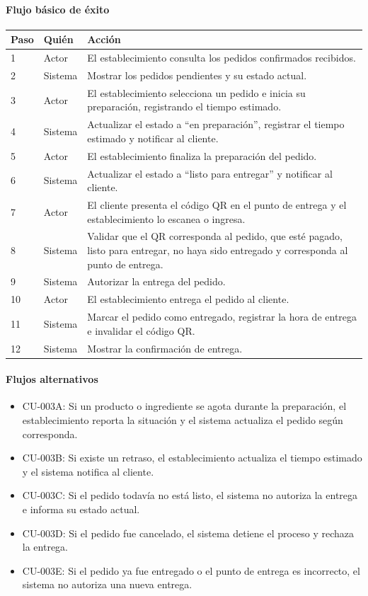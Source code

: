 \paragraph{Flujo básico de éxito}
\begin{longtable}{P{1.1cm}P{1.8cm}P{10.5cm}}
\toprule
\textbf{Paso} & \textbf{Quién} & \textbf{Acción}\\
\midrule
{} & Actor & El establecimiento consulta los pedidos confirmados recibidos.\\
2 & Sistema & Mostrar los pedidos pendientes y su estado actual.\\
3 & Actor & El establecimiento selecciona un pedido e inicia su preparación, registrando el tiempo estimado.\\
4 & Sistema & Actualizar el estado a “en preparación”, registrar el tiempo estimado y notificar al cliente.\\
5 & Actor & El establecimiento finaliza la preparación del pedido.\\
6 & Sistema & Actualizar el estado a “listo para entregar” y notificar al cliente.\\
7 & Actor & El cliente presenta el código QR en el punto de entrega y el establecimiento lo escanea o ingresa.\\
8 & Sistema & Validar que el QR corresponda al pedido, que esté pagado, listo para entregar, no haya sido entregado y corresponda al punto de entrega.\\
9 & Sistema & Autorizar la entrega del pedido.\\
10 & Actor & El establecimiento entrega el pedido al cliente.\\
11 & Sistema & Marcar el pedido como entregado, registrar la hora de entrega e invalidar el código QR.\\
12 & Sistema & Mostrar la confirmación de entrega.\\
\bottomrule
\end{longtable}

\paragraph{Flujos alternativos}
\begin{itemize}[leftmargin=1.4em, topsep=1pt]
  \item CU-003A: Si un producto o ingrediente se agota durante la preparación, el establecimiento reporta la situación y el sistema actualiza el pedido según corresponda.
  \item CU-003B: Si existe un retraso, el establecimiento actualiza el tiempo estimado y el sistema notifica al cliente.
  \item CU-003C: Si el pedido todavía no está listo, el sistema no autoriza la entrega e informa su estado actual.
  \item CU-003D: Si el pedido fue cancelado, el sistema detiene el proceso y rechaza la entrega.
  \item CU-003E: Si el pedido ya fue entregado o el punto de entrega es incorrecto, el sistema no autoriza una nueva entrega.
\end{itemize}

